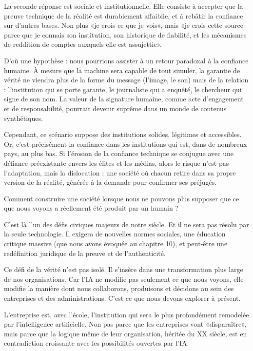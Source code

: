 La seconde réponse est sociale et institutionnelle. Elle consiste à accepter que la preuve technique de la réalité est durablement affaiblie, et à rebâtir la confiance sur d'autres bases. Non plus «je crois ce que je vois», mais «je crois cette source parce que je connais son institution, son historique de fiabilité, et les mécanismes de reddition de comptes auxquels elle est assujettie».

D'où une hypothèse : nous pourrions assister à un retour paradoxal à la confiance humaine. À mesure que la machine sera capable de tout simuler, la garantie de vérité ne viendra plus de la forme du message (l'image, le son) mais de la relation : l'institution qui se porte garante, le journaliste qui a enquêté, le chercheur qui signe de son nom. La valeur de la signature humaine, comme acte d'engagement et de responsabilité, pourrait devenir suprême dans un monde de contenus synthétiques.

Cependant, ce scénario suppose des institutions solides, légitimes et accessibles. Or, c'est précisément la confiance dans les institutions qui est, dans de nombreux pays, au plus bas. Si l'érosion de la confiance technique se conjugue avec une défiance préexistante envers les élites et les médias, alors le risque n'est pas l'adaptation, mais la dislocation : une société où chacun retire dans sa propre version de la réalité, générée à la demande pour confirmer ses préjugés.

\begin{aiquote}
Comment construire une société lorsque nous ne pouvons plus supposer que ce que nous voyons a réellement été produit par un humain ?
\end{aiquote}

C'est là l'un des défis civiques majeurs de notre siècle. Et il ne sera pas résolu par la seule technologie. Il exigera de nouvelles normes sociales, une éducation critique massive (que nous avons évoquée au chapitre 10), et peut-être une redéfinition juridique de la preuve et de l'authenticité.

Ce défi de la vérité n'est pas isolé. Il s'insère dans une transformation plus large de nos organisations. Car l'IA ne modifie pas seulement ce que nous voyons, elle modifie la manière dont nous collaborons, produisons et décidons au sein des entreprises et des administrations. C'est ce que nous devons explorer à présent.


L'entreprise est, avec l'école, l'institution qui sera le plus profondément remodelée par l'intelligence artificielle. Non pas parce que les entreprises vont «disparaître», mais parce que la logique même de leur organisation, héritée du XX siècle, est en contradiction croissante avec les possibilités ouvertes par l'IA.

